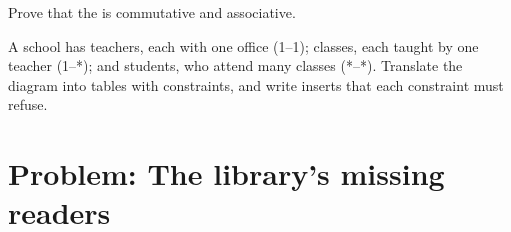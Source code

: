 \begin{exercise}[$\star\star\star$]\label{exo:b1:relational-model:11}
Prove that the  is commutative and associative.
\end{exercise}

\begin{exercise}[$\star\star\star$]\label{exo:b1:relational-model:12}
A school has teachers, each with one office (1--1); classes, each taught by one teacher (1--*); and students, who attend
many classes (*--*). Translate the diagram into tables with constraints, and write inserts that each constraint must
refuse.
\end{exercise}

\section{Problem: The library's missing readers}\label{sec:b1:relational-model:problem}

